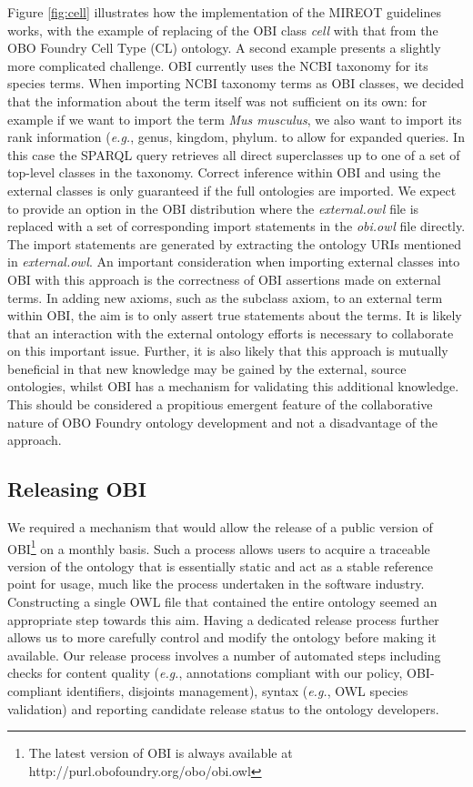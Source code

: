 \documentclass{elsart}       %
\begin{document}
Figure \ref{fig:cell} illustrates how the implementation of the MIREOT guidelines works, with the example of  replacing of the OBI class \emph{cell} with that from the OBO Foundry Cell Type (CL) ontology\cite{cell}.
A second example presents a slightly more complicated challenge.
OBI currently uses the NCBI taxonomy for its species terms.
When importing NCBI taxonomy terms as OBI classes, we decided that the information about the term itself was not sufficient on its own: for example if we want to import the term \emph{Mus musculus}, we also want to import its rank information (\emph{e.g.}, genus, kingdom, phylum. to allow for expanded queries.
In this case the SPARQL query retrieves all direct superclasses up to one of a set of top-level classes in the taxonomy. 
Correct inference within OBI and using the external classes is only guaranteed if the full ontologies are imported.
We expect to provide an option in the OBI distribution where the \emph{external.owl} file is replaced with a set of corresponding import statements in the \textit{obi.owl} file directly. 
The import statements are generated by extracting the ontology URIs mentioned in \emph{external.owl}. 
An important consideration when importing external classes into OBI with this approach is the correctness of OBI assertions made on external terms.
In adding new axioms, such as the subclass axiom, to an external term within OBI, the aim is to only assert true statements about the terms.
It is likely that an interaction with the external ontology efforts is necessary to collaborate on this important issue. Further, it is also likely that this approach is mutually beneficial in that new knowledge may be gained by the external, source ontologies, whilst OBI has a mechanism for validating this additional knowledge. This should be considered a propitious emergent feature of the collaborative nature of OBO Foundry ontology development and not a disadvantage of the approach.

\subsection{Releasing OBI}

We required a mechanism that would allow the release of a public version of OBI\footnote{The latest version of OBI is always available at http://purl.obofoundry.org/obo/obi.owl} on a monthly basis.
 Such a process allows users to acquire a traceable version of the ontology that is essentially static and act as a stable reference point for usage, much like the process undertaken in the software industry. 
 Constructing a single OWL file that contained the entire ontology seemed an appropriate step towards this aim.
Having a dedicated release process further allows us to more carefully control and modify the ontology before making it available.
Our release process involves a number of automated steps including checks for content quality (\emph{e.g.}, annotations compliant with our policy, OBI-compliant identifiers, disjoints management), syntax (\emph{e.g.}, OWL species validation) and reporting candidate release status to the ontology developers.
\end{document}
